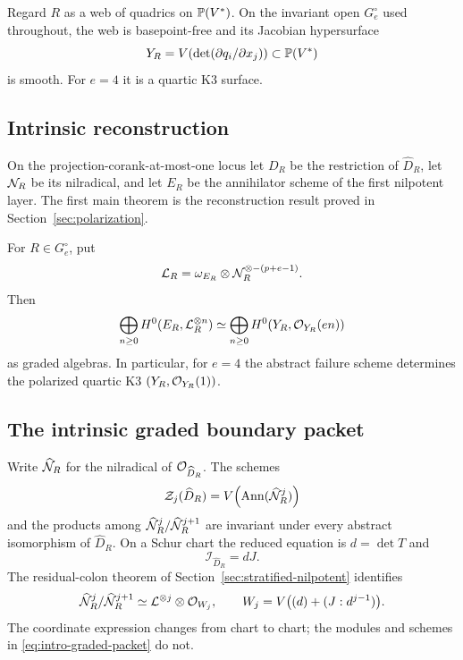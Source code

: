 Regard \(R\) as a web of quadrics on \(\mathbb P(V^*)\).  On the
invariant open \(G_e^\circ\) used throughout, the web is
basepoint-free and its Jacobian hypersurface
\begin{equation}\label{eq:Y-intro}
 Y_R=V\!\left(\det(\partial q_i/\partial x_j)\right)
 \subset\mathbb P(V^*)
\end{equation}
is smooth.  For \(e=4\) it is a quartic K3 surface.

\subsection{Intrinsic reconstruction}

On the projection-corank-at-most-one locus let \(D_R\) be the
restriction of \(\widehat D_R\), let \(\mathcal N_R\) be its
nilradical, and let \(E_R\) be the annihilator scheme of the first
nilpotent layer.  The first main theorem is the reconstruction result
proved in Section~\ref{sec:polarization}.

\begin{theorem}
\label{thm:main-reconstruction}
For \(R\in G_e^\circ\), put
\[
 \mathcal L_R=\omega_{E_R}\otimes
 \mathcal N_R^{\otimes-(p+e-1)}.
\]
Then
\[
 \bigoplus_{n\ge0}H^0(E_R,\mathcal L_R^{\otimes n})
 \simeq
 \bigoplus_{n\ge0}H^0(Y_R,\mathcal O_{Y_R}(en))
\]
as graded algebras.  In particular, for \(e=4\) the abstract
failure scheme determines the polarized quartic K3
\((Y_R,\mathcal O_{Y_R}(1))\).
\end{theorem}

\subsection{The intrinsic graded boundary packet}

Write \(\widehat{\mathcal N}_R\) for the nilradical of
\(\mathcal O_{\widehat D_R}\).  The schemes
\[
 \mathcal Z_j(\widehat D_R)=
 V\!\left(\operatorname{Ann}(\widehat{\mathcal N}_R^{j})\right)
\]
and the products among
\(\widehat{\mathcal N}_R^j/\widehat{\mathcal N}_R^{j+1}\) are invariant under
every abstract isomorphism of \(\widehat D_R\).  On a Schur chart
the reduced equation is \(d=\det T\) and
\[
 \mathcal I_{\widehat D_R}=dJ.
\]
The residual-colon theorem of Section~\ref{sec:stratified-nilpotent}
identifies
\begin{equation}\label{eq:intro-graded-packet}
 \widehat{\mathcal N}_R^j/\widehat{\mathcal N}_R^{j+1}
 \simeq
 \mathcal L^{\otimes j}\otimes\mathcal O_{W_j},\qquad
 W_j=V\bigl((d)+(J:d^{j-1})\bigr).
\end{equation}
The coordinate expression changes from chart to chart; the modules
and schemes in \eqref{eq:intro-graded-packet} do not.

